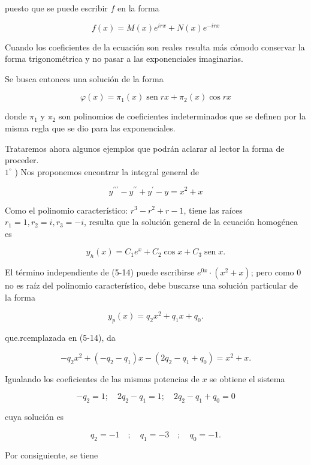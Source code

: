 \documentclass[10pt]{article}
\theoremstyle{plain}
\theoremstyle{definition}
\theoremstyle{remark}
\begin{document}
puesto que se puede escribir $f$ en la forma


\begin{equation*}
f(x)=M(x) e^{i r x}+N(x) e^{-i r x} \tag{5-12}
\end{equation*}


Cuando los coeficientes de la ecuación son reales resulta más cómodo conservar la forma trigonométrica y no pasar a las exponenciales imaginarias.

Se busca entonces una solución de la forma

$$
\varphi(x)=\pi_{1}(x) \operatorname{sen} r x+\pi_{2}(x) \cos r x
$$

donde $\pi_{1}$ y $\pi_{2}$ son polinomios de coeficientes indeterminados que se definen por la misma regla que se dio para las exponenciales.

Trataremos ahora algunos ejemplos que podrán aclarar al lector la forma de proceder.\\
$1^{\circ}$ ) Nos proponemos encontrar la integral general de


\begin{equation*}
y^{\prime \prime \prime}-y^{\prime \prime}+y^{\prime}-y=x^{2}+x \tag{5-14}
\end{equation*}


Como el polinomio característico: $r^{3}-r^{2}+r-1$, tiene las raíces $r_{1}=1, r_{2}=i, r_{3}=-i$, resulta que la solución general de la ecuación homogénea es

$$
y_{h}(x)=C_{1} e^{x}+C_{2} \cos x+C_{3} \operatorname{sen} x .
$$

El término independiente de (5-14) puede escribirse $e^{0 x} \cdot\left(x^{2}+x\right)$; pero como 0 no es raíz del polinomio característico, debe buscarse una solución particular de la forma

$$
y_{p}(x)=q_{2} x^{2}+q_{1} x+q_{0} .
$$

que.rcemplazada en (5-14), da

$$
-q_{2} x^{2}+\left(-q_{2}-q_{1}\right) x-\left(2 q_{2}-q_{1}+q_{0}\right)=x^{2}+x .
$$

Igualando los coeficientes de las mismas potencias de $x$ se obtiene el sistema

$$
-q_{2}=1 ; \quad 2 q_{2}-q_{1}=1 ; \quad 2 q_{2}-q_{1}+q_{0}=0
$$

cuya solución es

$$
q_{2}=-1 \quad ; \quad q_{1}=-3 \quad ; \quad q_{0}=-1 .
$$

Por consiguiente, se tiene
\end{document}
